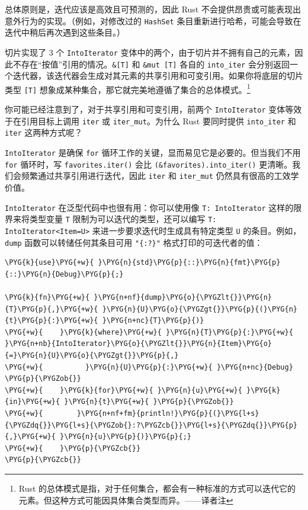 总体原则是，迭代应该是高效且可预测的，因此 Rust 不会提供昂贵或可能表现出意外行为的实现。（例如，对修改过的 \texttt{HashSet} 条目重新进行哈希，可能会导致在迭代中稍后再次遇到这些条目。）

切片实现了 3 个 \texttt{IntoIterator} 变体中的两个，由于切片并不拥有自己的元素，因此不存在“按值”引用的情况。\texttt{\&[T]} 和 \texttt{\&mut [T]} 各自的 \texttt{into\_iter} 会分别返回一个迭代器，该迭代器会生成对其元素的共享引用和可变引用。如果你将底层的切片类型 \texttt{[T]} 想象成某种集合，那它就完美地遵循了集合的总体模式。\footnote{Rust 的总体模式是指，对于任何集合，都会有一种标准的方式可以迭代它的元素。但这种方式可能因具体集合类型而异。——译者注}

你可能已经注意到了，对于共享引用和可变引用，前两个 \texttt{IntoIterator} 变体等效于在引用目标上调用 \texttt{iter} 或 \texttt{iter\_mut}。为什么 Rust 要同时提供 \texttt{into\_iter} 和 \texttt{iter} 这两种方式呢？

\texttt{IntoIterator} 是确保 \texttt{for} 循环工作的关键，显而易见它是必要的。但当我们不用 \texttt{for} 循环时，写 \texttt{favorites.iter()} 会比 \texttt{(\&favorites).into\_iter()} 更清晰。我们会频繁通过共享引用进行迭代，因此 \texttt{iter} 和 \texttt{iter\_mut} 仍然具有很高的工效学价值。

\texttt{IntoIterator} 在泛型代码中也很有用：你可以使用像 \texttt{T: IntoIterator} 这样的限界来将类型变量 \texttt{T} 限制为可以迭代的类型，还可以编写 \texttt{T: IntoIterator<Item=U>} 来进一步要求迭代时生成具有特定类型 \texttt{U} 的条目。例如，\texttt{dump} 函数可以转储任何其条目可用 \texttt{"\{:?\}"} 格式打印的可迭代者的值：

\begin{Verbatim}[commandchars=\\\{\},breaklines=true,breakanywhere=true,fontsize=\codefont,xleftmargin=17bp]
\PYG{k}{use}\PYG{+w}{ }\PYG{n}{std}\PYG{p}{::}\PYG{n}{fmt}\PYG{p}{::}\PYG{n}{Debug}\PYG{p}{;}

\PYG{k}{fn}\PYG{+w}{ }\PYG{n+nf}{dump}\PYG{o}{\PYGZlt{}}\PYG{n}{T}\PYG{p}{,}\PYG{+w}{ }\PYG{n}{U}\PYG{o}{\PYGZgt{}}\PYG{p}{(}\PYG{n}{t}\PYG{p}{:}\PYG{+w}{ }\PYG{n+nc}{T}\PYG{p}{)}
\PYG{+w}{    }\PYG{k}{where}\PYG{+w}{ }\PYG{n}{T}\PYG{p}{:}\PYG{+w}{ }\PYG{n+nb}{IntoIterator}\PYG{o}{\PYGZlt{}}\PYG{n}{Item}\PYG{o}{=}\PYG{n}{U}\PYG{o}{\PYGZgt{}}\PYG{p}{,}
\PYG{+w}{          }\PYG{n}{U}\PYG{p}{:}\PYG{+w}{ }\PYG{n+nc}{Debug}
\PYG{p}{\PYGZob{}}
\PYG{+w}{    }\PYG{k}{for}\PYG{+w}{ }\PYG{n}{u}\PYG{+w}{ }\PYG{k}{in}\PYG{+w}{ }\PYG{n}{t}\PYG{+w}{ }\PYG{p}{\PYGZob{}}
\PYG{+w}{        }\PYG{n+nf+fm}{println!}\PYG{p}{(}\PYG{l+s}{\PYGZdq{}}\PYG{l+s}{\PYGZob{}:?\PYGZcb{}}\PYG{l+s}{\PYGZdq{}}\PYG{p}{,}\PYG{+w}{ }\PYG{n}{u}\PYG{p}{)}\PYG{p}{;}
\PYG{+w}{    }\PYG{p}{\PYGZcb{}}
\PYG{p}{\PYGZcb{}}
\end{Verbatim}

